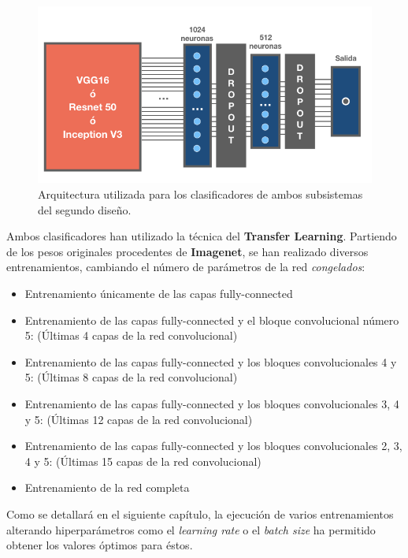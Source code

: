 \documentclass[
  12pt,
  spanish,
  a4paperpaper,
]{report}
\providecommand{\tightlist}{%
  \setlength{\itemsep}{0pt}\setlength{\parskip}{0pt}}
\begin{document}
\begin{figure}
\centering
\includegraphics[width=1\textwidth,height=\textheight]{source/figures/des2.png}
\caption{Arquitectura utilizada para los clasificadores de ambos
subsistemas del segundo diseño. \label{des2}}
\end{figure}

Ambos clasificadores han utilizado la técnica del \textbf{Transfer
Learning}. Partiendo de los pesos originales procedentes de
\textbf{Imagenet}, se han realizado diversos entrenamientos, cambiando
el número de parámetros de la red \emph{congelados}:

\begin{itemize}
\tightlist
\item
  Entrenamiento únicamente de las capas fully-connected
\item
  Entrenamiento de las capas fully-connected y el bloque convolucional
  número 5: (Últimas 4 capas de la red convolucional)
\item
  Entrenamiento de las capas fully-connected y los bloques
  convolucionales 4 y 5: (Últimas 8 capas de la red convolucional)
\item
  Entrenamiento de las capas fully-connected y los bloques
  convolucionales 3, 4 y 5: (Últimas 12 capas de la red convolucional)
\item
  Entrenamiento de las capas fully-connected y los bloques
  convolucionales 2, 3, 4 y 5: (Últimas 15 capas de la red
  convolucional)
\item
  Entrenamiento de la red completa
\end{itemize}

Como se detallará en el siguiente capítulo, la ejecución de varios
entrenamientos alterando hiperparámetros como el \emph{learning rate} o
el \emph{batch size} ha permitido obtener los valores óptimos para
éstos.
\end{document}
